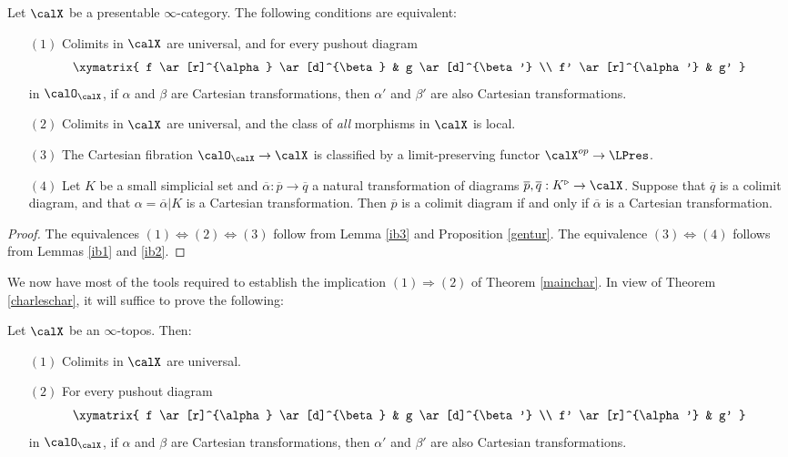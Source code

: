 \begin{theorem}\label{charleschar}
Let $\calX$ be a presentable $\infty$-category. The following conditions are equivalent:
\begin{itemize}
\item[$(1)$] Colimits in $\calX$ are universal, and for every 
pushout diagram
$$ \xymatrix{ f \ar[r]^{\alpha} \ar[d]^{\beta} & g \ar[d]^{\beta'} \\
f' \ar[r]^{\alpha'} & g' }$$
in $\calO_{\calX}$, if $\alpha$ and $\beta$ are Cartesian transformations, then
$\alpha'$ and $\beta'$ are also Cartesian transformations.

\item[$(2)$] Colimits in $\calX$ are universal, and the class of {\em all} morphisms
in $\calX$ is local.

\item[$(3)$] The Cartesian fibration $\calO_{\calX} \rightarrow \calX$ is classified by a limit-preserving functor $\calX^{op} \rightarrow \LPres$.

\item[$(4)$] Let $K$ be a small simplicial set and 
$\overline{\alpha}: \overline{p} \rightarrow \overline{q}$ a natural transformation of diagrams
$\overline{p}, \overline{q}: K^{\triangleright} \rightarrow \calX$. Suppose that
$\overline{q}$ is a colimit diagram, and that $\alpha = \overline{\alpha} | K$ is a Cartesian transformation. Then $\overline{p}$ is a colimit diagram if and only if $\overline{\alpha}$ is 
a Cartesian transformation.
\end{itemize}
\end{theorem}

\begin{proof}
The equivalences $(1) \Leftrightarrow (2) \Leftrightarrow (3)$ follow from Lemma \ref{ib3} and Proposition \ref{gentur}. The equivalence $(3) \Leftrightarrow (4)$ follows from Lemmas \ref{ib1} and \ref{ib2}. 
\end{proof}

We now have most of the tools required to establish the implication $(1) \Rightarrow (2)$ of Theorem \ref{mainchar}. In view of Theorem \ref{charleschar}, it will suffice to prove the following:

\begin{proposition}\label{lemonade}
Let $\calX$ be an $\infty$-topos. Then:
\begin{itemize}
\item[$(1)$] Colimits in $\calX$ are universal.
\item[$(2)$] For every pushout diagram $$ \xymatrix{ f \ar[r]^{\alpha} \ar[d]^{\beta} & g \ar[d]^{\beta'} \\
f' \ar[r]^{\alpha'} & g' }$$
in $\calO_{\calX}$, if $\alpha$ and $\beta$ are Cartesian transformations, then
$\alpha'$ and $\beta'$ are also Cartesian transformations.
\end{itemize}
\end{proposition}

